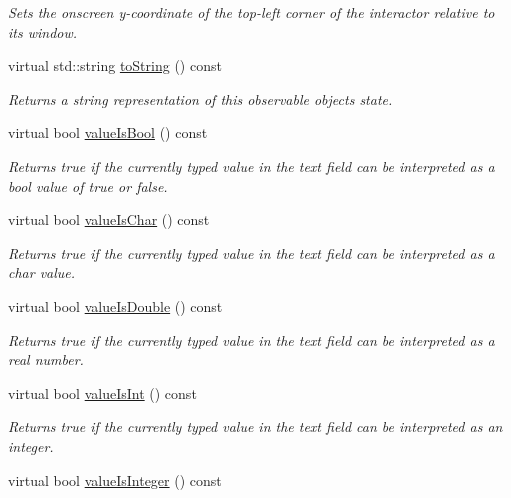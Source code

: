 \begin{DoxyCompactItemize}
\begin{DoxyCompactList}\small\item\em Sets the onscreen y-\/coordinate of the top-\/left corner of the interactor relative to its window. \end{DoxyCompactList}\item 
virtual std\+::string \mbox{\hyperlink{classsgl_1_1GObservable_a1fe5121d6528fdea3f243321b3fa3a49}{to\+String}} () const
\begin{DoxyCompactList}\small\item\em Returns a string representation of this observable object\textquotesingle{}s state. \end{DoxyCompactList}\item 
virtual bool \mbox{\hyperlink{classsgl_1_1GTextField_a203f90275053ab957b1ea5a40dc3dd1e}{value\+Is\+Bool}} () const
\begin{DoxyCompactList}\small\item\em Returns true if the currently typed value in the text field can be interpreted as a bool value of true or false. \end{DoxyCompactList}\item 
virtual bool \mbox{\hyperlink{classsgl_1_1GTextField_ac7a337b1e4c2f752a7f3fb634c92b442}{value\+Is\+Char}} () const
\begin{DoxyCompactList}\small\item\em Returns true if the currently typed value in the text field can be interpreted as a char value. \end{DoxyCompactList}\item 
virtual bool \mbox{\hyperlink{classsgl_1_1GTextField_aa80caadc7498333f74a08b4cdc0528c1}{value\+Is\+Double}} () const
\begin{DoxyCompactList}\small\item\em Returns true if the currently typed value in the text field can be interpreted as a real number. \end{DoxyCompactList}\item 
virtual bool \mbox{\hyperlink{classsgl_1_1GTextField_a4bccf08b3b712af3839106a1cbdc5d02}{value\+Is\+Int}} () const
\begin{DoxyCompactList}\small\item\em Returns true if the currently typed value in the text field can be interpreted as an integer. \end{DoxyCompactList}\item 
virtual bool \mbox{\hyperlink{classsgl_1_1GTextField_af5aaf003739648d9aee89a17e715a57e}{value\+Is\+Integer}} () const

\end{DoxyCompactItemize}
